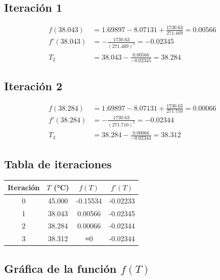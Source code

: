 \documentclass[12pt]{article}
\begin{document}
\subsection*{Iteración 1}

\begin{align*}
f(38.043) &= 1.69897 - 8.07131 + \frac{1730.63}{271.469} = 0.00566 \\
f'(38.043) &= -\frac{1730.63}{(271.469)^2} = -0.02345 \\
T_2 &= 38.043 - \frac{0.00566}{-0.02345} = 38.284
\end{align*}

\subsection*{Iteración 2}

\begin{align*}
f(38.284) &= 1.69897 - 8.07131 + \frac{1730.63}{271.710} = 0.00066 \\
f'(38.284) &= -\frac{1730.63}{(271.710)^2} = -0.02344 \\
T_3 &= 38.284 - \frac{0.00066}{-0.02344} = 38.312
\end{align*}

\subsection*{Tabla de iteraciones}

\begin{center}
\begin{tabular}{cccc}
\toprule
\textbf{Iteración} & \( T \) (°C) & \( f(T) \) & \( f'(T) \) \\
\midrule
0 & 45.000 & -0.15534 & -0.02233 \\
1 & 38.043 & 0.00566  & -0.02345 \\
2 & 38.284 & 0.00066  & -0.02344 \\
3 & 38.312 & ≈0       & -0.02344 \\
\bottomrule
\end{tabular}
\end{center}

\subsection*{Gráfica de la función \( f(T) \)}

\begin{center}
\end{center}
\end{document}
